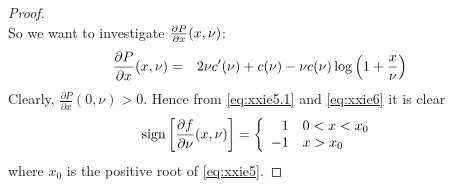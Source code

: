 \documentclass[11pt,a4]{amsart}
\newcommand{\pd}{\partial}
\newcommand{\1}{{\mathbf 1}}
\begin{document}
\begin{proof}
\begin{equation}
  \end{equation}
  So we want to investigate ${\pd P \over \pd x}(x, \nu)$:
  \begin{eqnarray}
    {\pd P \over \pd x}(x, \nu) &=&
    2 \nu c'(\nu) + c(\nu) - \nu c(\nu) \log\left(
      1 + {x \over \nu}
    \right)
    \label{eq:xxie6}
  \end{eqnarray}
  Clearly, $\frac{\pd P}{\pd x}(0, \nu) > 0$. Hence from
  \eqref{eq:xxie5.1} and
  \eqref{eq:xxie6} it is clear
  \begin{equation*}
    \text{sign}\left[
      {\pd f \over \pd\nu}(x, \nu)
    \right]
    = \left\{
    \begin{array}{rl}
      1 & 0 < x < x_0 \\
      -1 & x > x_0
    \end{array}
    \right.
  \end{equation*}
  where $x_0$ is the positive root of \eqref{eq:xxie5}.
\end{proof}
\end{document}
